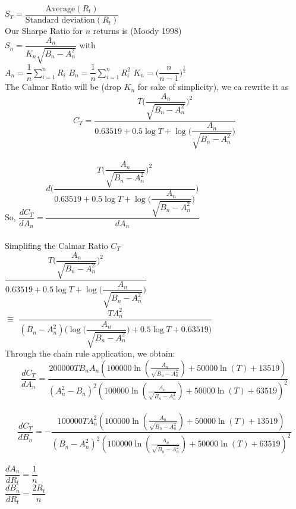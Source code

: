 \documentclass[12pt, a4paper, twoside]{article}
\begin{document}
$ S_T = \dfrac{\text{Average}(R_t)}{\text{Standard deviation}(R_t)} $\\

Our Sharpe Ratio for $ n $ returns is (Moody 1998)\\

$ S_n = \dfrac{A_n}{K_n\sqrt{B_n - A_{n}^{2}}} $ with\\

$ A_n = \dfrac{1}{n}\sum_{i=1}^{n}R_i $	$ B_n = \dfrac{1}{n}\sum_{i=1}^{n}R_{i}^{2} $	$ K_n = \bigg(\dfrac{n}{n-1}\bigg)^{\frac{1}{2}} $\\

The Calmar Ratio will be (drop $K_n$ for sake of simplicity), we ca rewrite it as\\



$$ C_T  = \dfrac{T\bigg(\dfrac{A_n}{\sqrt{B_n - A_{n}^{2}}}\bigg)^2}{0.63519 + 0.5\log T + \log \bigg(\dfrac{A_n}{\sqrt{B_n - A_{n}^{2}}}\bigg)}$$\\

So, $\dfrac{dC_T}{dA_n} = \dfrac{d\Bigg(\dfrac{T\bigg(\dfrac{A_n}{\sqrt{B_n - A_{n}^{2}}}\bigg)^2}{0.63519 + 0.5\log T + \log \bigg(\dfrac{A_n}{\sqrt{B_n - A_{n}^{2}}}\bigg)}\Bigg)}{dA_n}$\\
\\

Simplifing the Calmar Ratio $C_T$\\

$\dfrac{T\bigg(\dfrac{A_n}{\sqrt{B_n - A_{n}^{2}}}\bigg)^2}{0.63519 + 0.5\log T + \log \bigg(\dfrac{A_n}{\sqrt{B_n - A_{n}^{2}}}\bigg)}$\\
$ \equiv$
$\dfrac{TA_{n}^{2}}{(B_n - A_{n}^{2})\bigg(\log \bigg(\dfrac{A_n}{\sqrt{B_n - A_{n}^{2}}}\bigg)+ 0.5\log T + 0.63519\bigg)}$\\

Through the chain rule application, we obtain:\\

$$ \dfrac{dC_T}{dA_n} = \dfrac{200000TB_nA_n\left(100000\ln\left(\frac{A_n}{\sqrt{B_n-A_{n}^{2}}}\right)+50000\ln\left(T\right)+13519\right)}{\left(A_{n}^{2}-B_n\right)^2\left(100000\ln\left(\frac{A_n}{\sqrt{B_n-A_{n}^{2}}}\right)+50000\ln\left(T\right)+63519\right)^2} $$\\

$$ \dfrac{dC_T}{dB_n} = -\dfrac{100000TA_{n}^{2}\left(100000\ln\left(\frac{A_n}{\sqrt{B_n-A_{n}^{2}}}\right)+50000\ln\left(T\right)+13519\right)}{\left(B_n-A_{n}^{2}\right)^2\left(100000\ln\left(\frac{A_n}{\sqrt{B_n-A_{n}^{2}}}\right)+50000\ln\left(T\right)+63519\right)^2}$$\\


$ \dfrac{dA_n}{dR_t} = \dfrac{1}{n}$\\

$ \dfrac{dB_n}{dR_t} = \dfrac{2R_t}{n}$\\
\end{document}
